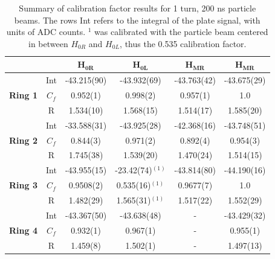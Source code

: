 \begin{table}[h]
    \centering
    \begin{tabular}{cccccc}
    \hline
                            &                & $\mathbf{H_{0R}}$         & $\mathbf{H_{0L}}$        & $\mathbf{H_{MR}}$         & $\mathbf{H_{MR}}$         \\ \hline
    \multirow{3}{*}{\textbf{Ring 1}} & Int & -43.215(90) & -43.932(69) & -43.763(42) & -43.675(29) \\
                            & $C_f$              & 0.952(1)    & 0.998(2)    & 0.957(1)    & 1.0         \\
                            & R              & 1.534(10)   & 1.568(15)   & 1.514(17)   & 1.585(20)   \\ \hline
    \multirow{3}{*}{\textbf{Ring 2}} & Int & -33.588(31) & -43.925(28) & -42.368(16) & -43.748(51) \\
                            & $C_f$              & 0.844(3)    & 0.971(2)    & 0.892(4)    & 0.954(3)    \\
                            & R              & 1.745(38)  & 1.539(20)   & 1.470(24)   & 1.514(15)   \\
                            \hline
    \multirow{3}{*}{\textbf{Ring 3}} & Int & -43.955(15) & -23.42(74)${}^{(1)}$ & -43.814(80) & -44.190(16) \\
                            & $C_f$              & 0.9508(2)   & 0.535(16)${}^{(1)}$  & 0.9677(7)   & 1.0         \\
                            & R              & 1.482(29)   & 1.565(31)${}^{(1)}$  & 1.517(22)   & 1.552(29)   \\ \hline
    \multirow{3}{*}{\textbf{Ring 4}} & Int & -43.367(50) & -43.638(48) & -           & -43.429(32) \\
                            & $C_f$             & 0.932(1)    & 0.967(1)    & -           & 0.955(1)    \\
                            & R              & 1.459(8)    & 1.502(1)    & -           & 1.497(13)   \\ \hline 
    \end{tabular}
    \caption{Summary of calibration factor results for 1 turn, 200 ns particle beams. The rows Int refers to the integral of the plate signal, with units of ADC counts. ${}^{1}$ was calibrated with the particle beam centered in between $H_{0R}$ and $H_{0L}$, thus the 0.535 calibration factor. }
    \label{tab:CalFac}
\end{table}


